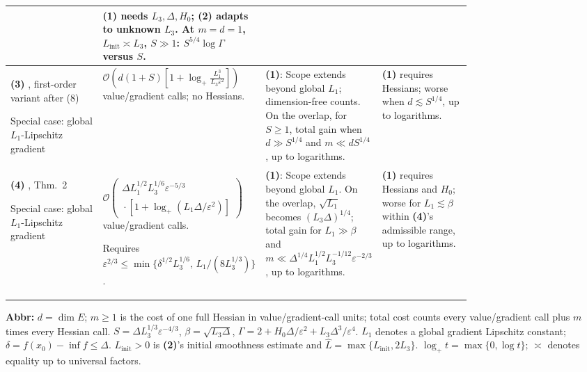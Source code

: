 \begin{table}[tp]
\begin{threeparttable}
\begin{tabularx}{\linewidth}{@{}>{\raggedright\arraybackslash}p{0.20\linewidth}>{\raggedright\arraybackslash}p{0.32\linewidth}>{\raggedright\arraybackslash}p{0.25\linewidth}>{\raggedright\arraybackslash}X@{}}
& \textbf{(1)} needs $L_3,\Delta,H_0$; \textbf{(2)} adapts to unknown $L_3$. At $m=d=1$, $L_{\mathrm{init}}\asymp L_3$, $S\gg1$: $S^{5/4}\log\Gamma$ versus $S$. \\
\midrule
\textbf{(3)} \citep{tdsHinder2018v2}, first-order variant after (8)\par Special case: global $L_1$-Lipschitz gradient
& $\mathcal{O}\!\left(d(1+S)\left[1+\log_+\!\frac{L_1^3}{L_3\varepsilon^2}\right]\right)$ value/gradient calls; no Hessians.
& \textbf{(1)}: Scope extends beyond global $L_1$; dimension-free counts. On the overlap, for $S\geq1$, total gain when $d\gg S^{1/4}$ and $m\ll dS^{1/4}$, up to logarithms.
& \textbf{(1)} requires Hessians; worse when $d\lesssim S^{1/4}$, up to logarithms. \\
\midrule
\textbf{(4)} \citep{tdsCarmonEtAl2017}, Thm.~2\par Special case: global $L_1$-Lipschitz gradient
& $\mathcal{O}\!\left(\begin{gathered}\Delta L_1^{1/2}L_3^{1/6}\varepsilon^{-5/3}\\{}\cdot[1+\log_+(L_1\Delta/\varepsilon^2)]\end{gathered}\right)$ value/gradient calls.\par Requires $\varepsilon^{2/3}\leq\min\{\delta^{1/2}L_3^{1/6},\,L_1/(8L_3^{1/3})\}$.
& \textbf{(1)}: Scope extends beyond global $L_1$. On the overlap, $\sqrt{L_1}$ becomes $(L_3\Delta)^{1/4}$; total gain for $L_1\gg\beta$ and $m\ll\Delta^{1/4}L_1^{1/2}L_3^{-1/12}\varepsilon^{-2/3}$, up to logarithms.
& \textbf{(1)} requires Hessians and $H_0$; worse for $L_1\lesssim\beta$ within \textbf{(4)}'s admissible range, up to logarithms. \\
\bottomrule
\end{tabularx}
\begin{tablenotes}[flushleft]\footnotesize
\item[] \textbf{Abbr:} $d=\dim E$; $m\geq1$ is the cost of one full Hessian in value/gradient-call units; total cost counts every value/gradient call plus $m$ times every Hessian call. $S=\Delta L_3^{1/3}\varepsilon^{-4/3}$, $\beta=\sqrt{L_3\Delta}$, $\Gamma=2+H_0\Delta/\varepsilon^2+L_3\Delta^3/\varepsilon^4$. $L_1$ denotes a global gradient Lipschitz constant; $\delta=f(x_0)-\inf f\leq\Delta$. $L_{\mathrm{init}}>0$ is \textbf{(2)}'s initial smoothness estimate and $\widehat L=\max\{L_{\mathrm{init}},2L_3\}$. $\log_+t=\max\{0,\log t\}$; $\asymp$ denotes equality up to universal factors.
\end{tablenotes}
\end{threeparttable}
\end{table}
\clearpage
